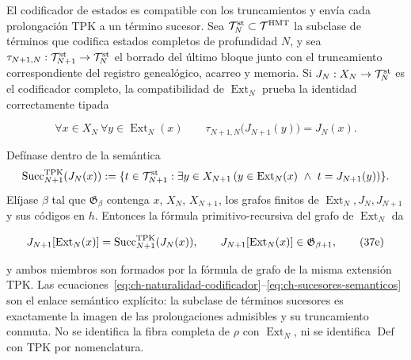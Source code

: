 El codificador de estados es compatible con los truncamientos y envía cada
prolongación TPK a un término sucesor. Sea
\(\mathcal T_N^{\rm st}\subset\mathcal T^{\rm HMT}\) la subclase de términos
que codifica estados completos de profundidad \(N\), y sea
\(\tau_{N+1,N}:\mathcal T_{N+1}^{\rm st}\to\mathcal T_N^{\rm st}\) el borrado
del último bloque junto con el truncamiento correspondiente del registro genealógico,
acarreo y memoria. Si \(J_N:X_N\to\mathcal T_N^{\rm st}\) es el codificador
completo, la compatibilidad de \(\operatorname{Ext}_N\) prueba la identidad
correctamente tipada

\[
 \forall x\in X_N\ \forall y\in\operatorname{Ext}_N(x)\qquad
 \tau_{N+1,N}\bigl(J_{N+1}(y)\bigr)=J_N(x).
\tag{37e$_0$}\label{eq:ch-naturalidad-codificador}
\]

Defínase dentro de la semántica
\[
 \operatorname{Succ}^{\rm TPK}_{N+1}(J_N(x)):=
 \{t\in\mathcal T_{N+1}^{\rm st}:\exists y\in X_{N+1}\,
   (y\in\operatorname{Ext}_N(x)\ \wedge\ t=J_{N+1}(y))\}.
\]
Elíjase \(\beta\) tal que \(\mathfrak G_\beta\) contenga \(x\), \(X_N\),
\(X_{N+1}\), los grafos finitos de
\(\operatorname{Ext}_N,J_N,J_{N+1}\) y sus códigos en \(h\). Entonces la
fórmula primitivo-recursiva del grafo de \(\operatorname{Ext}_N\) da

\[
 J_{N+1}[\operatorname{Ext}_N(x)]
 =\operatorname{Succ}^{\rm TPK}_{N+1}(J_N(x)),
 \qquad
 J_{N+1}[\operatorname{Ext}_N(x)]
 \in\mathfrak G_{\beta+1},
\tag{37e}\label{eq:ch-sucesores-semanticos}
\]

y ambos miembros son formados por la fórmula de grafo de la misma extensión
TPK. Las ecuaciones~\eqref{eq:ch-naturalidad-codificador}--\eqref{eq:ch-sucesores-semanticos} son el enlace semántico explícito: la
subclase de términos sucesores es exactamente la imagen de las prolongaciones
admisibles y su truncamiento conmuta. No se identifica la fibra completa de
\(\rho\) con \(\operatorname{Ext}_N\), ni se identifica
\(\operatorname{Def}\) con TPK por nomenclatura.

